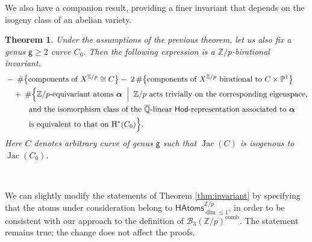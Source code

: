 \documentclass[12pt,a4paper]{amsart}
\newtheorem{theorem}{Theorem}[section]
\theoremstyle{definition}
\theoremstyle{remark}
\newcommand{\Z}{\mathbb{Z}}
\begin{document}
We also have a companion result, providing a finer invariant that depends on the isogeny class of an abelian variety.

\begin{theorem}\label{thm:invariant-fine} Under the assumptions of the previous theorem, let us also fix a genus $\mathsf g\geq 2$ curve $C_0$. Then the following expression is a \(\mathbb{Z}/p\)-birational invariant.
\begin{equation}
\begin{split}
  &-\;\#\bigl\{
    \text{components of } X^{\mathbb{Z}/p} \cong C  
  \bigr\} 
   -\; 2\,\#\bigl\{
    \text{components of $X^{\mathbb Z/p}$ birational to } C \times \mathbb{P}^1  
  \bigr\} \\
  &\quad +\; \#\Bigl\{
    \mathbb{Z}/p\text{-equivariant atoms } \boldsymbol{\alpha} 
    \;\Bigm|\; 
    \mathbb{Z}/p \text{ acts trivially on the corresponding eigenspace,} \\
  &\qquad\quad 
    \text{and the isomorphism class of the } \overline{\mathbb{Q}}\text{-linear } 
    \mathsf{Hod}\text{-representation associated to } \boldsymbol{\alpha} \\
  &\qquad\quad 
    \text{is equivalent to that on } \mathrm{H}^{\ast}(C_0)
  \Bigr\}.
\end{split}
\end{equation}
Here $C$ denotes arbitrary curve of genus $\mathsf g$ such  that $\operatorname{Jac}(C)$ is isogenous to $\operatorname{Jac}(C_0)$.
\end{theorem}

\ 


We can slightly modify the statements of Theorem \ref{thm:invariant} by specifying that the atoms under consideration belong to \(\mathsf{HAtoms}^{\Z/p}_{\dim \leq 1}\), in order to be consistent with our approach to the definition of $\mathcal{B}_3(\mathbb{Z}/p)^{\mathrm{comb}}$. The statement remains true; the change does not affect the proofs.

\
\end{document}
